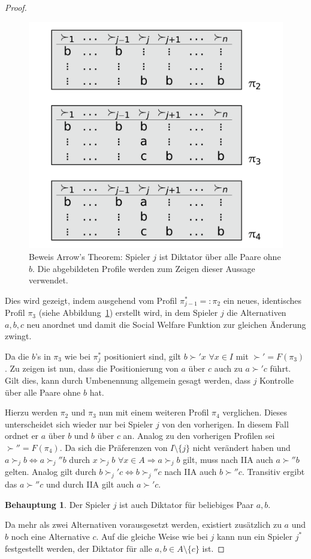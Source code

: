 \documentclass[a4paper,11pt]{article}
\theoremstyle{definition}
\theoremstyle{plain}
\theoremstyle{definition}
\newtheorem{claim}{Behauptung}
\begin{document}
\begin{proof}
	\begin{figure}
		\centering
		\includegraphics[width=.5\textwidth]{img/arrow(3).pdf}
		\caption{Beweis Arrow's Theorem: Spieler $j$ ist Diktator über alle Paare ohne $b$. Die abgebildeten Profile werden zum Zeigen dieser Aussage verwendet.}
		\label{fig:arr3}
	\end{figure}

	Dies wird gezeigt, indem ausgehend vom Profil $\pi_{j-1}^* =: \pi_2$ ein neues, identisches Profil $\pi_3$ (siehe Abbildung~\ref{fig:arr3}) erstellt wird, in dem Spieler $j$ die Alternativen $a,b,c$ neu anordnet und damit die Social Welfare Funktion zur gleichen Änderung zwingt.
	
	Da die $b$'s in $\pi_3$ wie bei $\pi_{j}^*$ positioniert sind, gilt $b \succ' x$ $\forall x \in I$ mit $\succ' = F(\pi_3)$. Zu zeigen ist nun, dass die Positionierung von $a$ über $c$ auch zu $a \succ' c$ führt. Gilt dies, kann durch Umbenennung allgemein gesagt werden, dass $j$ Kontrolle über alle Paare ohne $b$ hat.
	
	Hierzu werden $\pi_2$ und $\pi_3$ nun mit einem weiteren Profil $\pi_4$ verglichen. Dieses unterscheidet sich wieder nur bei Spieler $j$ von den vorherigen. In diesem Fall ordnet er $a$ über $b$ und $b$ über $c$ an. Analog zu den vorherigen Profilen sei $\succ'' = F(\pi_4)$. Da sich die Präferenzen von $I \setminus \{j\}$ nicht verändert haben und $a \succ_j b \iff a \succ_j'' b$ durch $x \succ_j b$ $\forall x \in A \Rightarrow a \succ_j b$ gilt, muss nach IIA auch $a \succ'' b$ gelten. Analog gilt durch $b \succ_j' c \iff b \succ_j'' c$ nach IIA auch $b \succ'' c$. Transitiv ergibt das $a \succ'' c$ und durch IIA gilt auch $a \succ' c$.
	
	\begin{claim}
		Der Spieler $j$ ist auch Diktator für beliebiges Paar $a, b$.
	\end{claim}

	Da mehr als zwei Alternativen vorausgesetzt werden, existiert zusätzlich zu $a$ und $b$ noch eine Alternative $c$. Auf die gleiche Weise wie bei $j$ kann nun ein Spieler $j^*$ festgestellt werden, der Diktator für alle $a, b \in A \setminus \{c\}$ ist.
	

\end{proof}
\end{document}

